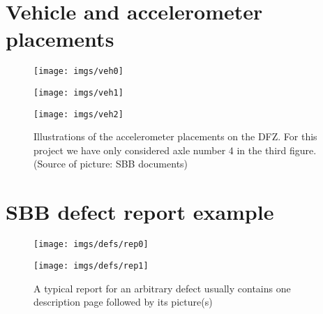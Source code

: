 \section{Vehicle and accelerometer placements}
\label{figs:veh}
\begin{figure}[H]
	\centering
	\texttt{[image: imgs/veh0]}
	\label{fig:veh0}
	
	\texttt{[image: imgs/veh1]}
	\label{fig:veh1}
	
	\texttt{[image: imgs/veh2]}
	\caption{Illustrations of the accelerometer placements on the DFZ. For this project we have only considered axle number 4 in the third figure. (Source of picture: SBB documents)}
	\label{fig:veh2}
\end{figure}

\section{SBB defect report example}
\label{app:report}
\begin{figure}[H]
	\centering
	\texttt{[image: imgs/defs/rep0]}
	\caption{}
	\texttt{[image: imgs/defs/rep1]}
	\caption{A typical report for an arbitrary defect usually contains one description page followed by its picture(s)}
	\label{fig:veh2}
\end{figure}



